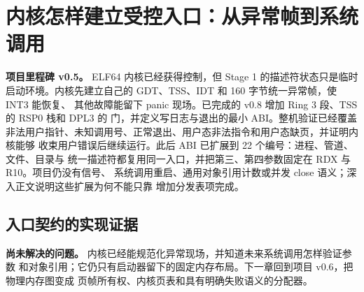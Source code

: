 \chapter{内核怎样建立受控入口：从异常帧到系统调用}

\begin{statebox}
\textbf{项目里程碑 v0.5。} ELF64 内核已经获得控制，但 Stage 1 的描述符状态只是临时
启动环境。内核先建立自己的 GDT、TSS、IDT 和 160 字节统一异常帧，使 INT3 能恢复、
其他故障能留下 panic 现场。已完成的 v0.8 增加 Ring 3 段、TSS 的 RSP0 栈和
DPL3 的  门，并定义写日志与退出的最小 ABI。整机验证已经覆盖
非法用户指针、未知调用号、正常退出、用户态非法指令和用户态缺页，并证明内核能够
收束用户错误后继续运行。此后 ABI 已扩展到 22 个编号：进程、管道、文件、目录与
统一描述符都复用同一入口，并把第三、第四参数固定在 RDX 与 R10。项目仍没有信号、
系统调用重启、通用对象引用计数或并发 close 语义；深入正文说明这些扩展为何不能只靠
增加分发表项完成。
\end{statebox}




\section{入口契约的实现证据}

\begin{problemframe}
\textbf{尚未解决的问题。} 内核已经能规范化异常现场，并知道未来系统调用怎样验证参数
和对象引用；它仍只有启动器留下的固定内存布局。下一章回到项目 v0.6，把物理内存图变成
页帧所有权、内核页表和具有明确失败语义的分配器。
\end{problemframe}
